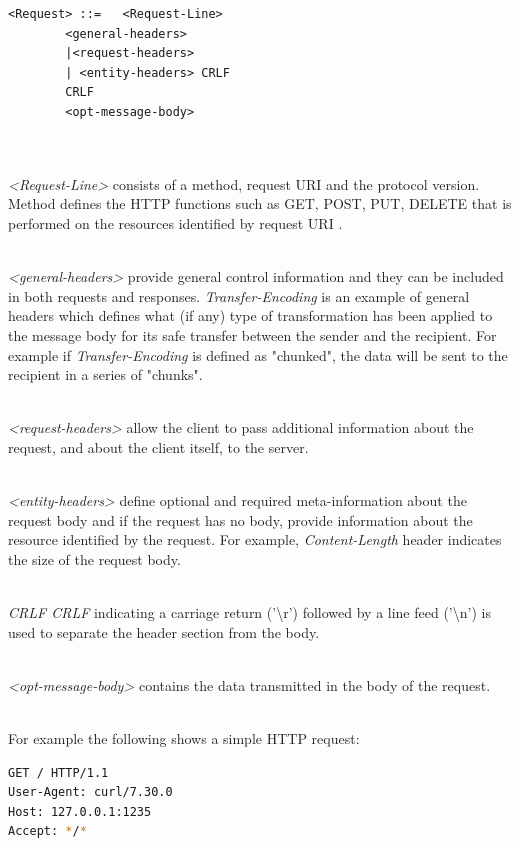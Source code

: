 \documentclass[a4paper,11pt,twoside]{report}
\begin{document}
\begin{lstlisting}[language=terminal, xleftmargin=.3in,xrightmargin=3.25in]
<Request> ::=	<Request-Line>
		<general-headers>
		|<request-headers>
		| <entity-headers> CRLF
		CRLF 
		<opt-message-body>
		
\end{lstlisting} 
\noindent\\
\textit{<Request-Line>} consists of a method, request URI and the protocol version. Method defines the HTTP functions such as GET, POST, PUT, DELETE that is performed on the resources identified by request URI . 

\noindent\\
\textit{<general-headers>} provide general control information and they can be included in both requests and responses. \textit{Transfer-Encoding} is an example of general headers which defines what (if any) type of transformation has been applied to the message body for its safe transfer between the sender and the recipient. For example if \textit{Transfer-Encoding} is defined as "chunked", the data will be sent to the recipient in a series of "chunks". 

\noindent\\
\textit{<request-headers>} allow the client to pass additional information about the request, and about the client itself, to the server. 

\noindent\\
\textit{<entity-headers>} define optional and required meta-information about the request body and if the request has no body, provide information about the resource identified by the request. For example, \textit{Content-Length} header indicates the size of the request body. 

\noindent\\
\textit{CRLF CRLF} indicating a carriage return ('\textbackslash r') followed by a line feed ('\textbackslash n') is used to separate the header section from the body.

\noindent\\
\textit{<opt-message-body>} contains the data transmitted in the body of the request.

\noindent\\
For example the following shows a simple HTTP request:

\begin{lstlisting}[language=bash,xleftmargin=.25in,  xrightmargin=.25in]
GET / HTTP/1.1
User-Agent: curl/7.30.0
Host: 127.0.0.1:1235
Accept: */*
\end{lstlisting} 
\end{document}
